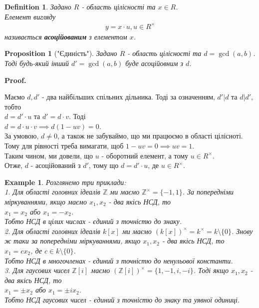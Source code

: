 \documentclass[a4paper, 14pt]{extarticle}
\makeatletter
\theoremstyle{theoremdd}
\theoremstyle{theoremdd}
\newtheorem{definition}[theorem]{Definition}
\theoremstyle{theoremdd}
\theoremstyle{theoremdd}
\newtheorem{example}[theorem]{Example}
\theoremstyle{theoremdd}
\newtheorem{proposition}[theorem]{Proposition}
\theoremstyle{theoremdd}
\theoremstyle{theoremdd}
\theoremstyle{theoremdd}
\def\qed{$\blacksquare$}
\renewenvironment{proof}[1][Proof.\\]{\par
\pushQED{\hfill \qed}%
\normalfont \topsep6\p@\@plus6\p@\relax
\trivlist
\item\relax
{\bfseries
#1\@addpunct{.}}\hspace\labelsep\ignorespaces
}{%
\popQED\endtrivlist\@endpefalse
}
\makeatother
\begin{document}
\begin{definition}
Задано $R$ - область цілісності та $x \in R$.\\
Елемент вигляду
\begin{align*}
y = x \cdot u, u \in R^\times
\end{align*}
називається \textbf{асоційованим} з елементом $x$.
\end{definition}



\begin{proposition}["Єдиність"]
Задано $R$ - область цілісності та $d = \gcd(a,b)$.\\
Тоді будь-який інший $d' = \gcd(a,b)$ буде асоційовним з $d$.
\end{proposition}

\begin{proof}
Маємо $d,d'$ - два найбільших спільних дільника. Тоді за означенням, $d' | d$ та $d | d'$, тобто\\
$d = d' \cdot u$ та $d' = d \cdot v$. Тоді\\
$d = d \cdot u \cdot v \implies d(1-uv) = 0$.\\
За умовою, $d \neq 0$, а також не забуваймо, що ми працюємо в області цілісноті. Тому для рівності треба вимагати, щоб $1 - uv = 0 \implies uv = 1$.\\
Таким чином, ми довели, що $u$ - оборотний елемент, а тому $u \in R^\times$.\\
Отже, $d$ - асоційований з $d'$, тому що $d = d' \cdot u$, де $u \in R^\times$.
\end{proof}

\begin{example} Розглянемо три приклади:\\
1. Для області головних ідеалів $\mathbb{Z}$ ми маємо $\mathbb{Z}^\times = \{-1,1\}$. За попередніми міркуваннями, якщо маємо $x_1,x_2$ - два якісь НСД, то\\
$x_1 = x_2$ або $x_1 = -x_2$.\\
Тобто НСД в цілих числах - єдиний з точністю до знаку.
\bigskip \\
2. Для області головних ідеалів $k[x]$ ми маємо $(k[x])^\times = k^\times = k \setminus \{0\}$. Знову ж таки за попередніми міркуваннями, якщо $x_1,x_2$ - два якісь НСД, то\\
$x_1 = c x_2$, де $c \in k \setminus \{0\}$.\\
Тобто НСД в многочленах - єдиний з точністю до ненульової константи.
\bigskip \\
3. Для гаусових чисел $\mathbb{Z}[i]$ маємо $(\mathbb{Z}[i])^\times = \{1,-1,i,-i\}$. Тоді якщо $x_1,x_2$ - два якісь НСД, то\\
$x_1 = \pm x_2$ або $x_1 = \pm ix_2$.\\
Тобто НСД гаусових чисел - єдиний з точністю до знаку та уявної одиниці.
\end{example}
\end{document}
